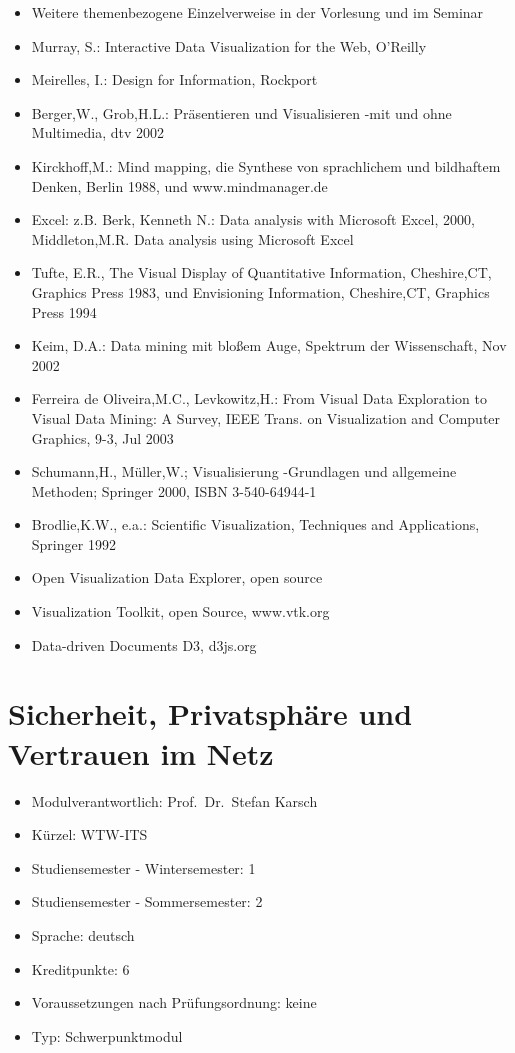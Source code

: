 \begin{itemize}
\tightlist
\item
  Weitere themenbezogene Einzelverweise in der Vorlesung und im Seminar
\item
  Murray, S.: Interactive Data Visualization for the Web, O'Reilly
\item
  Meirelles, I.: Design for Information, Rockport
\item
  Berger,W., Grob,H.L.: Präsentieren und Visualisieren -mit und ohne
  Multimedia, dtv 2002
\item
  Kirckhoff,M.: Mind mapping, die Synthese von sprachlichem und
  bildhaftem Denken, Berlin 1988, und www.mindmanager.de
\item
  Excel: z.B. Berk, Kenneth N.: Data analysis with Microsoft Excel,
  2000, Middleton,M.R. Data analysis using Microsoft Excel
\item
  Tufte, E.R., The Visual Display of Quantitative Information,
  Cheshire,CT, Graphics Press 1983, und Envisioning Information,
  Cheshire,CT, Graphics Press 1994
\item
  Keim, D.A.: Data mining mit bloßem Auge, Spektrum der Wissenschaft,
  Nov 2002
\item
  Ferreira de Oliveira,M.C., Levkowitz,H.: From Visual Data Exploration
  to Visual Data Mining: A Survey, IEEE Trans. on Visualization and
  Computer Graphics, 9-3, Jul 2003
\item
  Schumann,H., Müller,W.; Visualisierung -Grundlagen und allgemeine
  Methoden; Springer 2000, ISBN 3-540-64944-1
\item
  Brodlie,K.W., e.a.: Scientific Visualization, Techniques and
  Applications, Springer 1992
\item
  Open Visualization Data Explorer, open source
\item
  Visualization Toolkit, open Source, www.vtk.org
\item
  Data-driven Documents D3, d3js.org
\end{itemize}

\chapter{Sicherheit, Privatsphäre und Vertrauen im
Netz}\label{sicherheit-privatsphuxe4re-und-vertrauen-im-netz}

\begin{itemize}
\tightlist
\item
  Modulverantwortlich: Prof.~Dr.~Stefan Karsch
\item
  Kürzel: WTW-ITS
\item
  Studiensemester - Wintersemester: 1
\item
  Studiensemester - Sommersemester: 2
\item
  Sprache: deutsch
\item
  Kreditpunkte: 6
\item
  Voraussetzungen nach Prüfungsordnung: keine
\item
  Typ: Schwerpunktmodul
\end{itemize}

